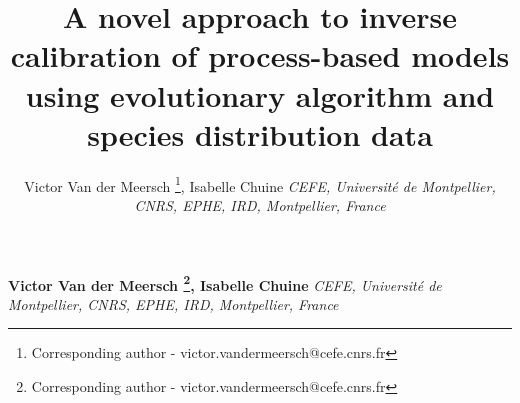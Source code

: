 \documentclass[11pt,]{article}
\title{A novel approach to inverse calibration of process-based models
using evolutionary algorithm and species distribution data  }
\author{\Large Victor Van der Meersch
\footnote{Corresponding author - victor.vandermeersch@cefe.cnrs.fr},
Isabelle Chuine\vspace{0.05in} \newline\newline\normalsize\emph{CEFE,
Université de Montpellier, CNRS, EPHE, IRD, Montpellier, France}  }
\date{}
\newcommand*{\authorfont}{\fontfamily{phv}\selectfont}
\begin{document}
%

{%
\setlength{\parindent}{0pt}
\thispagestyle{plain}
{\fontsize{18}{20}\selectfont\raggedright
\maketitle  %

}

{
   \vskip 13.5pt\relax \normalsize\fontsize{11}{12}
\textbf{\authorfont Victor Van der Meersch
\footnote{Corresponding author - victor.vandermeersch@cefe.cnrs.fr},
Isabelle Chuine} \hskip 15pt \emph{\small CEFE, Université de
Montpellier, CNRS, EPHE, IRD, Montpellier, France}   

}

}
\end{document}
